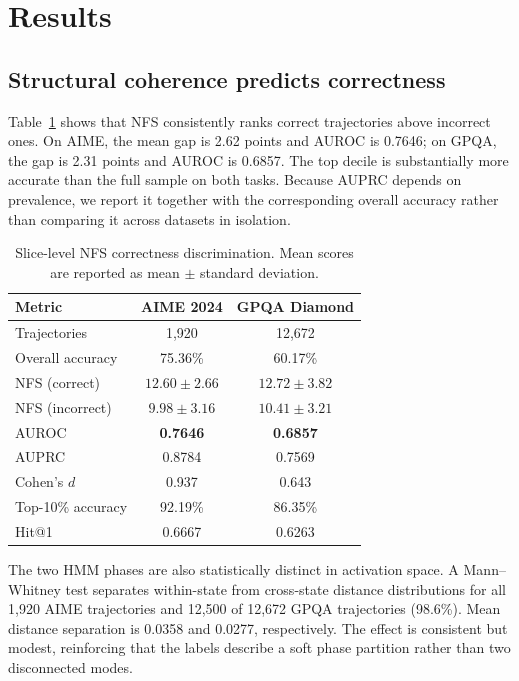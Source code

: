 \documentclass{article}
\newcommand{\nfs}{\textsc{NFS}}
\begin{document}
\section{Results}

\subsection{Structural coherence predicts correctness}

Table~\ref{tab:discrimination} shows that \nfs{} consistently ranks correct trajectories above incorrect ones. On AIME, the mean gap is 2.62 points and AUROC is 0.7646; on GPQA, the gap is 2.31 points and AUROC is 0.6857. The top decile is substantially more accurate than the full sample on both tasks. Because AUPRC depends on prevalence, we report it together with the corresponding overall accuracy rather than comparing it across datasets in isolation.

\begin{table}[H]
\caption{Slice-level \nfs{} correctness discrimination. Mean scores are reported as mean $\pm$ standard deviation.}
\label{tab:discrimination}
\centering
\small
\setlength{\tabcolsep}{5pt}
\begin{tabular}{lcc}
\toprule
Metric & AIME 2024 & GPQA Diamond \\
\midrule
Trajectories & 1,920 & 12,672 \\
Overall accuracy & 75.36\% & 60.17\% \\
\nfs{} (correct) & $12.60\pm2.66$ & $12.72\pm3.82$ \\
\nfs{} (incorrect) & $9.98\pm3.16$ & $10.41\pm3.21$ \\
AUROC & \textbf{0.7646} & \textbf{0.6857} \\
AUPRC & 0.8784 & 0.7569 \\
Cohen's $d$ & 0.937 & 0.643 \\
Top-10\% accuracy & 92.19\% & 86.35\% \\
Hit@1 & 0.6667 & 0.6263 \\
\bottomrule
\end{tabular}
\end{table}

The two HMM phases are also statistically distinct in activation space. A Mann--Whitney test separates within-state from cross-state distance distributions for all 1,920 AIME trajectories and 12,500 of 12,672 GPQA trajectories (98.6\%). Mean distance separation is 0.0358 and 0.0277, respectively. The effect is consistent but modest, reinforcing that the labels describe a soft phase partition rather than two disconnected modes.
\end{document}
